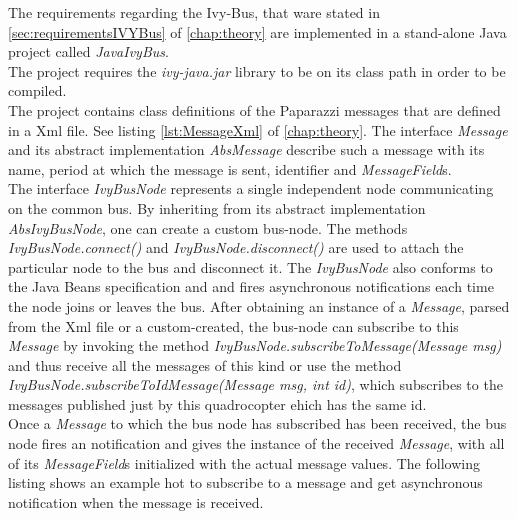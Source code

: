 The requirements regarding the Ivy-Bus, that ware stated in \ref{sec:requirementsIVYBus} of \ref{chap:theory} are implemented in a stand-alone Java project called \textit{JavaIvyBus}. \\
The project requires the \textit{ivy-java.jar} library to be on its class path in order to be compiled.\\
The project contains class definitions of the Paparazzi messages that are defined in a Xml file. See listing \ref{lst:MessageXml} of \ref{chap:theory}. The interface \textit{Message} and its abstract implementation \textit{AbsMessage} describe such a message with its name, period at which the message is sent, identifier and \textit{MessageField}s. \\
The interface \textit{IvyBusNode} represents a single independent node communicating on the common bus. By inheriting from its abstract implementation \textit{AbsIvyBusNode}, one can create a custom bus-node. The methods \textit{IvyBusNode.connect()} and \textit{IvyBusNode.disconnect()} are used to attach the particular node to the bus and disconnect it. The \textit{IvyBusNode} also conforms to the Java Beans specification and and fires asynchronous notifications each time the node joins or leaves the bus.
After obtaining an instance of a \textit{Message}, parsed from the Xml file or a custom-created, the bus-node can subscribe to this \textit{Message} by invoking the method \textit{IvyBusNode.subscribeToMessage(Message msg)} and thus receive all the messages of this kind or use the method \textit{IvyBusNode.subscribeToIdMessage(Message msg, int id)}, which subscribes to the messages published just by this quadrocopter ehich has the same id. \\
Once a \textit{Message} to which the bus node has subscribed has been received, the bus node fires an notification and gives the instance of the received \textit{Message}, with all of its \textit{MessageField}s initialized with the actual message values. The following listing shows an example hot to subscribe to a message and get asynchronous notification when the message is received.

